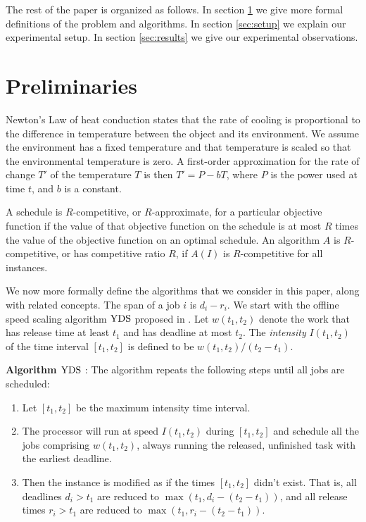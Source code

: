 \documentclass[11pt]{article}
\newcommand{\YDS}{{\rm YDS}}
\begin{document}
The rest of the paper is organized as follows. In section \ref{sec:preliminaries} we give more
formal definitions of the problem and algorithms.
In section \ref{sec:setup} we explain our experimental setup.
In section \ref{sec:results} we give our experimental observations.

\section{Preliminaries}
\label{sec:preliminaries} 





Newton's Law of heat conduction states that the rate of cooling is
proportional to the difference in temperature between the object and
its environment.
We assume the environment has a fixed temperature and that temperature
is scaled so that the environmental temperature is zero.
A first-order approximation for the rate of change $T'$ of the
temperature $T$ is then $T'=P-bT$, where $P$ is the
power used at time $t$, and $b$ is a constant.



A schedule is $R$-competitive, or $R$-approximate,
for a particular objective function
if the value of that objective function on the schedule is at most
$R$ times the value of the objective function on an optimal schedule.
An algorithm $A$ 
is $R$-competitive, or has competitive ratio $R$, if $A(I)$ is $R$-competitive
for all instances.

We now more formally define the algorithms that we consider in this paper, along
with related concepts.
The span of a job $i$ is $d_i - r_i$.
We start with the offline speed scaling algorithm 
$\YDS$ proposed in \cite{YDS}.
Let  $w(t_1,t_2)$ denote the work that has release time at least $t_1$ and has
deadline  at most $t_2$. The \emph{intensity} $I(t_1, t_2)$ 
of the time interval $[t_1, t_2]$ is
defined to be $w(t_1,t_2)/(t_2 - t_1)$.

\medskip
\noindent
{\bf Algorithm \boldmath$\YDS$\unboldmath} \cite{YDS}:
The algorithm repeats the following steps until all jobs are scheduled:
\begin{enumerate}
\item
Let $[t_1, t_2]$ be the maximum intensity time interval.
\item
The processor will
run at speed $I(t_1,t_2)$ during $[t_1, t_2]$ and schedule all
the jobs comprising $w(t_1,t_2)$, always running the released, 
unfinished task with the earliest deadline. 
\item
Then the instance is modified as if the times $[t_1, t_2]$ didn't exist.
That is, all deadlines $d_i > t_1$ are reduced to
$\max(t_1, d_i - (t_2  -t_1))$, and all release times $r_i > t_1$
are reduced to $\max(t_1, r_i - (t_2 - t_1))$. 
\end{enumerate}
\end{document}
